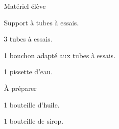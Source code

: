 
\begin{boiteMateriel}{Matériel élève}
  \effectifSeconde
  
  \begin{protocole}
    \item Support à tubes à essais.
    \item 3 tubes à essais.
    \item 1 bouchon adapté aux tubes à essais.
    \item 1 pissette d'eau.
  \end{protocole}
\end{boiteMateriel}


\begin{boiteMateriel}{À préparer}
  \begin{protocole}
    \item 1 bouteille d'huile.
    \item 1 bouteille de sirop.
  \end{protocole}
\end{boiteMateriel}